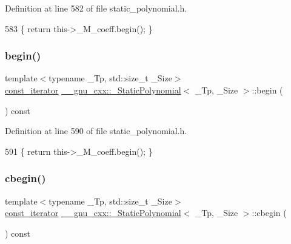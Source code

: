 Definition at line 582 of file static\+\_\+polynomial.\+h.


\begin{DoxyCode}
583       \{ \textcolor{keywordflow}{return} this->\_M\_coeff.begin(); \}
\end{DoxyCode}
\mbox{\label{class____gnu__cxx_1_1__StaticPolynomial_acb32e93b3c2f320dc51bbb3f918ae8b7}} 
\subsubsection{\texorpdfstring{begin()}{begin()}\hspace{0.1cm}{\footnotesize\ttfamily [2/2]}}
{\footnotesize\ttfamily template$<$typename \+\_\+\+Tp, std\+::size\+\_\+t \+\_\+\+Size$>$ \\
\hyperlink{class____gnu__cxx_1_1__StaticPolynomial_a2e806a3a61788a2fad49adf67725ae7e}{const\+\_\+iterator} \hyperlink{class____gnu__cxx_1_1__StaticPolynomial}{\+\_\+\+\_\+gnu\+\_\+cxx\+::\+\_\+\+Static\+Polynomial}$<$ \+\_\+\+Tp, \+\_\+\+Size $>$\+::begin (\begin{DoxyParamCaption}{ }\end{DoxyParamCaption}) const\hspace{0.3cm}{\ttfamily [inline]}}



Definition at line 590 of file static\+\_\+polynomial.\+h.


\begin{DoxyCode}
591       \{ \textcolor{keywordflow}{return} this->\_M\_coeff.begin(); \}
\end{DoxyCode}
\mbox{\label{class____gnu__cxx_1_1__StaticPolynomial_a5f4900e2888036e2edc649a95316b55c}} 
\subsubsection{\texorpdfstring{cbegin()}{cbegin()}}
{\footnotesize\ttfamily template$<$typename \+\_\+\+Tp, std\+::size\+\_\+t \+\_\+\+Size$>$ \\
\hyperlink{class____gnu__cxx_1_1__StaticPolynomial_a2e806a3a61788a2fad49adf67725ae7e}{const\+\_\+iterator} \hyperlink{class____gnu__cxx_1_1__StaticPolynomial}{\+\_\+\+\_\+gnu\+\_\+cxx\+::\+\_\+\+Static\+Polynomial}$<$ \+\_\+\+Tp, \+\_\+\+Size $>$\+::cbegin (\begin{DoxyParamCaption}{ }\end{DoxyParamCaption}) const\hspace{0.3cm}{\ttfamily [inline]}}



